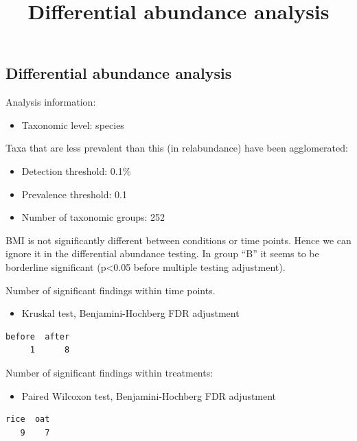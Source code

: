\documentclass[
]{article}
\title{Differential abundance analysis}
\author{}
\date{}
\providecommand{\tightlist}{%
  \setlength{\itemsep}{0pt}\setlength{\parskip}{0pt}}\usepackage{longtable,booktabs,array}
\begin{document}
\maketitle


\subsection{Differential abundance
analysis}\label{differential-abundance-analysis}

Analysis information:

\begin{itemize}
\tightlist
\item
  Taxonomic level: species
\end{itemize}

Taxa that are less prevalent than this (in relabundance) have been
agglomerated:

\begin{itemize}
\tightlist
\item
  Detection threshold: 0.1\%
\item
  Prevalence threshold: 0.1
\item
  Number of taxonomic groups: 252
\end{itemize}

BMI is not significantly different between conditions or time points.
Hence we can ignore it in the differential abundance testing. In group
``B'' it seems to be borderline significant (p\textless0.05 before
multiple testing adjustment).

Number of significant findings within time points.

\begin{itemize}
\tightlist
\item
  Kruskal test, Benjamini-Hochberg FDR adjustment
\end{itemize}

\begin{verbatim}
before  after 
     1      8 
\end{verbatim}

Number of significant findings within treatments:

\begin{itemize}
\tightlist
\item
  Paired Wilcoxon test, Benjamini-Hochberg FDR adjustment
\end{itemize}

\begin{verbatim}
rice  oat 
   9    7 
\end{verbatim}
\end{document}
